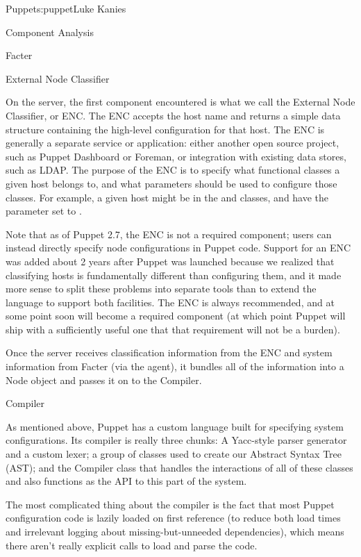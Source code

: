 \begin{aosachapter}{Puppet}{s:puppet}{Luke Kanies}
\begin{aosasect1}{Component Analysis}
\begin{aosasect2}{Facter}
\end{aosasect2}

\begin{aosasect2}{External Node Classifier}

On the server, the first component encountered is what we call the
External Node Classifier, or ENC.  The ENC accepts the host name and
returns a simple data structure containing the high-level
configuration for that host.  The ENC is generally a separate service
or application: either another open source project, such as Puppet
Dashboard or Foreman, or integration with existing data stores, such
as LDAP.  The purpose of the ENC is to specify what functional classes
a given host belongs to, and what parameters should be used to
configure those classes.  For example, a given host might be in the
 and  classes, and have the parameter 
set to .

Note that as of Puppet 2.7, the ENC is not a required component; users
can instead directly specify node configurations in Puppet code.
Support for an ENC was added about 2 years after Puppet was launched
because we realized that classifying hosts is fundamentally different
than configuring them, and it made more sense to split these problems
into separate tools than to extend the language to support both
facilities.  The ENC is always recommended, and at some point soon
will become a required component (at which point Puppet will ship with
a sufficiently useful one that that requirement will not be a burden).

Once the server receives classification information from the ENC and
system information from Facter (via the agent), it bundles all of the
information into a Node object and passes it on to the Compiler.

\end{aosasect2}

\begin{aosasect2}{Compiler}

As mentioned above, Puppet has a custom language built for specifying
system configurations.  Its compiler is really three chunks: A
Yacc-style parser generator and a custom lexer; a group of classes
used to create our Abstract Syntax Tree (AST); and the Compiler class
that handles the interactions of all of these classes and also
functions as the API to this part of the system.

The most complicated thing about the compiler is the fact that most
Puppet configuration code is lazily loaded on first reference (to reduce both load
times and irrelevant logging about missing-but-unneeded dependencies),
which means there aren't really explicit calls to load and parse the
code.


\end{aosasect2}
\end{aosasect1}
\end{aosachapter}
